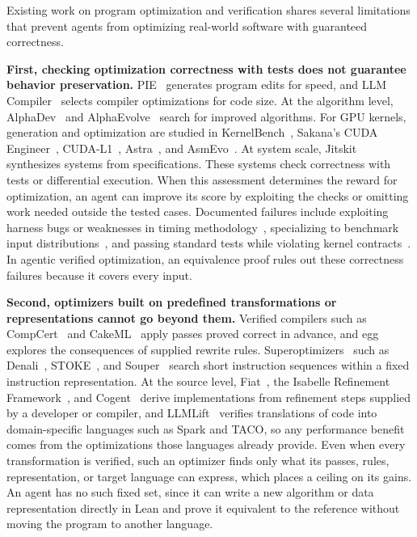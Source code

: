 \documentclass{article}
\begin{document}
Existing work on program optimization and verification shares several limitations that prevent agents from optimizing real-world software with guaranteed correctness.

\textbf{First, checking optimization correctness with tests does not guarantee behavior preservation.}
PIE~\citep{shypula2024learning} generates program edits for speed, and LLM Compiler~\citep{cummins2025llm} selects compiler optimizations for code size.
At the algorithm level, AlphaDev~\citep{mankowitz2023faster} and AlphaEvolve~\citep{novikov2025alphaevolve} search for improved algorithms.
For GPU kernels, generation and optimization are studied in KernelBench~\citep{ouyang2025kernelbench}, Sakana's CUDA Engineer~\citep{lange2025towards}, CUDA-L1~\citep{li2026cuda}, Astra~\citep{wei2025astra}, and AsmEvo~\citep{liu2026asmevo}.
At system scale, Jitskit~\citep{liu2026time} synthesizes systems from specifications.
These systems check correctness with tests or differential execution.
When this assessment determines the reward for optimization, an agent can improve its score by exploiting the checks or omitting work needed outside the tested cases.
Documented failures include exploiting harness bugs or weaknesses in timing methodology~\citep{lange2025towards,li2026cuda}, specializing to benchmark input distributions~\citep{liu2026time,zhang2026kernelbench}, and passing standard tests while violating kernel contracts~\citep{sarkar2026correctness,shah2026contract}.
In agentic verified optimization, an equivalence proof rules out these correctness failures because it covers every input.

\textbf{Second, optimizers built on predefined transformations or representations cannot go beyond them.}
Verified compilers such as CompCert~\citep{leroy2009formalverification} and CakeML~\citep{kumar2014cakeml} apply passes proved correct in advance, and egg~\citep{willsey2021egg} explores the consequences of supplied rewrite rules.
Superoptimizers~\citep{massalin1987superoptimizer} such as Denali~\citep{joshi2002denali}, STOKE~\citep{schkufza2013stochastic}, and Souper~\citep{sasnauskas2018souper} search short instruction sequences within a fixed instruction representation.
At the source level, Fiat~\citep{delaware2015fiat}, the Isabelle Refinement Framework~\citep{lammich2012applying}, and Cogent~\citep{oconnor2021cogent} derive implementations from refinement steps supplied by a developer or compiler, and LLMLift~\citep{bhatia2024verifiedcode} verifies translations of code into domain-specific languages such as Spark and TACO, so any performance benefit comes from the optimizations those languages already provide.
Even when every transformation is verified, such an optimizer finds only what its passes, rules, representation, or target language can express, which places a ceiling on its gains.
An agent has no such fixed set, since it can write a new algorithm or data representation directly in Lean and prove it equivalent to the reference without moving the program to another language.
\end{document}
